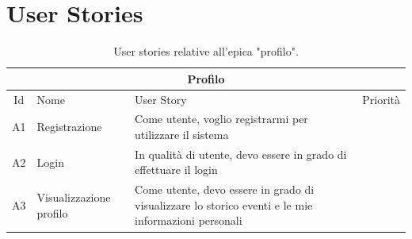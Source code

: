 \documentclass[9pt]{extarticle}
\begin{document}
\customtitle



\tableofcontents
\newpage

\section{User Stories}


	
\begin{table}[!htb]
	\centering
	\begin{tabular}{clp{7cm}l} %
		\toprule
		\multicolumn{4}{c}{\textbf{Profilo}}\\ \midrule
		Id & Nome & User Story & Priorità \\ \midrule
		A1  & Registrazione  & Come utente, voglio registrarmi per utilizzare il sistema & \\
		A2  & Login & In qualità di utente, devo essere in grado di effettuare il login & \\
		A3  & Visualizzazione profilo & Come utente, devo essere in grado di visualizzare lo storico eventi e le mie informazioni personali &  \\
		\bottomrule
	\end{tabular}
	\caption{User stories relative all'epica "profilo".}
	\label{tab:profili}
\end{table}
\end{document}

